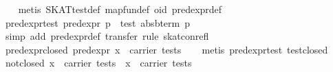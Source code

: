 \begin{isabellebody}
%
\isadelimproof
\ \ %
\endisadelimproof
%
\isatagproof
{}\isamarkupfalse%
\ {}metis\ SKAT{}test{}def\ map{}fun{}def\ o{}id\ pred{}expr{}def{}%
\endisatagproof
{\isafoldproof}%
%
\isadelimproof
\isanewline
%
\endisadelimproof
\isanewline
{}\isamarkupfalse%
\ pred{}expr{}test{}\ {}pred{}expr\ p\ {}\ test\ {}abs{}bterm\ p{}{}\isanewline
%
\isadelimproof
\ \ %
\endisadelimproof
%
\isatagproof
{}\isamarkupfalse%
\ {}simp\ add{}\ pred{}expr{}def{}\ transfer{}\ rule\ skat{}con{}refl{}%
\endisatagproof
{\isafoldproof}%
%
\isadelimproof
\isanewline
%
\endisadelimproof
\isanewline
{}\isamarkupfalse%
\ pred{}expr{}closed{}\ {}pred{}expr\ x\ {}\ carrier\ tests{}\isanewline
%
\isadelimproof
\ \ %
\endisadelimproof
%
\isatagproof
{}\isamarkupfalse%
\ {}metis\ pred{}expr{}test\ test{}closed{}%
\endisatagproof
{\isafoldproof}%
%
\isadelimproof
\isanewline
%
\endisadelimproof
\isanewline
{}\isamarkupfalse%
\ not{}closed{}\ {}x\ {}\ carrier\ tests\ {}\ {}x\ {}\ carrier\ tests{}\isanewline

\end{isabellebody}
